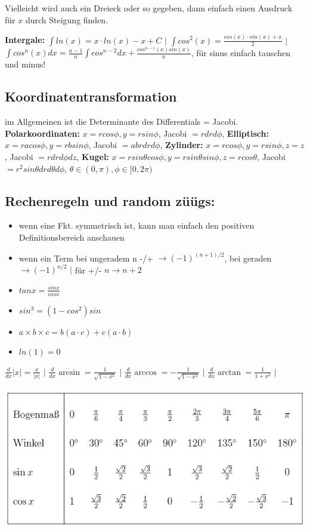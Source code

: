 \documentclass[a3paper, ngerman, 8pt]{article}
\begin{document}
\begin{multicols*}{3}
Vielleicht wird auch ein Dreieck oder so gegeben, dann einfach einen Ausdruck für $x$ durch Steigung finden. 

\textbf{Intergale:} $\int ln(x)=x\cdot ln(x) - x + C$ $\big \vert$ $\int cos^2(x)=\frac{cos(x)\cdot sin(x) + x}{2}$ $\big \vert$ $\int cos^n(x)dx=\frac{n-1}{n}\int cos^{n-2}dx+\frac{cos^{n-1}(x)sin(x)}{n}$, für sinus einfach tauschen und minus!

\subsection*{Koordinatentransformation}
im Allgemeinen ist die Determinante des Differentials = Jacobi. 
\textbf{Polarkoordinaten: } $x= rcos\phi, y=rsin\phi$, Jacobi $=rdrd\phi$, 
\textbf{Elliptisch:} $x=racos\phi, y = rbsin\phi$, Jacobi $=abrdrd\phi$, \textbf{Zylinder:} $x=rcos\phi, y=rsin\phi, z=z$, Jacobi $=rdrd\phi dz$, \textbf{Kugel:} $x=rsin\theta cos\phi, y=rsin\theta sin\phi, z=rcos\theta$, Jacobi $=r^2sin\theta drd\theta d\phi$, $\theta \in (0,\pi), \phi \in [0,2\pi)$

\subsection*{Rechenregeln und random züügs:} 
\begin{itemize}
	\item wenn eine Fkt. symmetrisch ist, kann man einfach den positiven Definitionsbereich anschauen
	\item wenn ein Term bei ungeradem n -/+ $\to (-1)^{(n+1)/2}$, bei geraden $\to (-1)^{n/2}$ $ \big \vert$ für +/- $n \to n+2$
	\item $tanx = \frac{sinx}{cosx}$
	\item $sin^3=(1-cos^2)sin$
	\item $a \times b \times c = b(a \cdot c) + c(a \cdot b)$
	\item $ln(1)=0$

\end{itemize}

$\frac{d}{dx} |x| = \frac{x}{|x|}$ $\big \vert$ $\frac{d}{dx} \arcsin = \frac{1}{\sqrt{1-x^2}}$ $\big \vert$ $\frac{d}{dx} \arccos = -\frac{1}{\sqrt{1-x^2}}$ $\big \vert$ $\frac{d}{dx} \arctan = \frac{1}{1+x^2}$ $\big \vert$

\includegraphics[width=1\linewidth]{winkel.png}





\end{multicols*}
\end{document}
